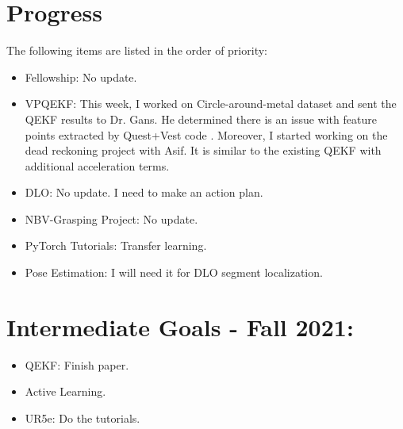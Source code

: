 \documentclass[11pt]{article}
\begin{document}
\section{Progress}
The following items are listed in the order of priority:
\begin{itemize}
      \item Fellowship: No update.
      \item VPQEKF: This week, I worked on Circle-around-metal dataset and sent
      the QEKF results to Dr. Gans. He determined there is an issue with feature
      points extracted by Quest+Vest code \cite{quest}. Moreover, I started working on the
      dead reckoning project with Asif. It is similar to the existing QEKF with
      additional acceleration terms.
      \item DLO: No update. I need to make an action plan.
      \item NBV-Grasping Project: No update.
      \item PyTorch Tutorials: Transfer learning.
      \item Pose Estimation: I will need it for DLO segment localization.
\end{itemize}


\section{Intermediate Goals - Fall 2021:}
\begin{itemize}
      \item QEKF: Finish paper.
      \item Active Learning.
      \item UR5e: Do the tutorials.
\end{itemize}


\newpage


\end{document}
